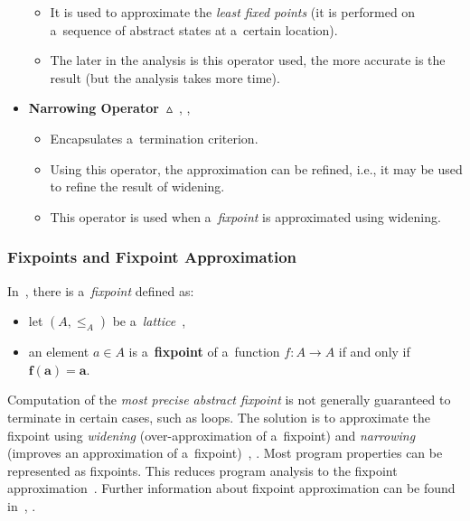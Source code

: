 \begin{itemize}
\begin{itemize}
            \item
                It is used to approximate the \emph{least fixed points}
                (it is performed on a~sequence of abstract states at
                a~certain location).

            \item
                The later in the analysis is this operator used, the more
                accurate is the result (but the analysis takes more time).
        \end{itemize}

    \item
        \textbf{Narrowing
        Operator~$ \vartriangle $}~\cite{programAnalysisNielson},
        \cite{wideningNarrowingCousot}, \cite{favAI}
        \begin{itemize}
            \item
                Encapsulates a~termination criterion.

            \item
                Using this operator, the approximation can be refined, i.e.,
                it may be used to refine the result of widening.

            \item
                This operator is used when a~\emph{fixpoint} is
                approximated using widening.
        \end{itemize}
\end{itemize}

\subsubsection*{Fixpoints and Fixpoint Approximation}

In~\cite{favLatticesAndFixpoints}, there is a~\emph{fixpoint} defined as:
\begin{itemize}
    \item
        let $ (A, \leq_A) $ be a~\emph{lattice}~\cite{favLatticesAndFixpoints},

    \item
        an element $ a \in A $ is a~\textbf{fixpoint} of a~function
        $ f : A \rightarrow A $ if and only if $ \boldsymbol{f(a) = a} $.
\end{itemize}
Computation of the \emph{most precise abstract fixpoint} is not generally
guaranteed to terminate in certain cases, such as loops. The solution is
to approximate the fixpoint using \emph{widening} (over-approximation of
a~fixpoint) and \emph{narrowing} (improves an approximation of
a~fixpoint)~\cite{favAI}, \cite{projectPracticeMarcin2018}.
Most program properties can be represented as fixpoints. This reduces program
analysis to the fixpoint approximation~\cite{AICousotWeb}. Further
information about fixpoint approximation can be found
in~\cite{programAnalysisNielson}, \cite{wideningNarrowingCousot}.

